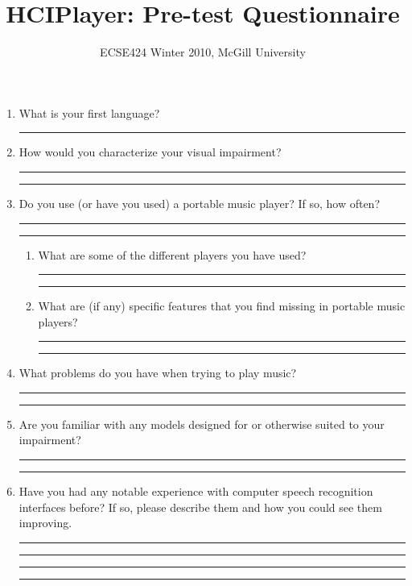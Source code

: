 \documentclass[10pt,letterpaper]{article}
\newcommand{\textline}{\begin{center}\rule{5in}{0.035cm}\end{center}}
\begin{document}
\title{HCIPlayer: Pre-test Questionnaire}
\author{ECSE424 Winter 2010, McGill University}
\renewcommand{\today}{Updated: Monday, March 8th, 2010}
\maketitle

\begin{enumerate}

\item What is your first language?

\textline

\item How would you characterize your visual impairment?

\textline
\textline

\item{Do you use (or have you used) a portable music player? If so, how often?}
\textline
\textline
	\begin{enumerate}
	\item{What are some of the different players you have used?}
	\textline
	\textline
	\item{What are (if any) specific features that you find missing in portable music players?}
	\textline
	\textline
	\end{enumerate}

\item{What problems do you have when trying to play music?}

\textline
\textline

\item{Are you familiar with any models designed for or otherwise suited to your impairment?}

\textline
\textline

\item{Have you had any notable experience with computer speech recognition interfaces before? If so, please describe them and how you could see them improving.}

\textline
\textline
\textline
\textline

\end{enumerate}
\end{document}
